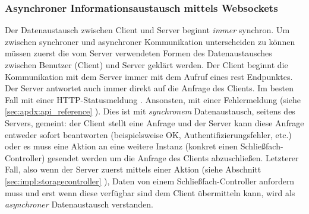 \subsubsection{Asynchroner Informationsaustausch mittels Websockets}\label{sec:impl:ws:datainterchange}
Der Datenaustausch zwischen Client und Server beginnt \textit{immer} synchron. Um zwischen synchroner und asynchroner Kommunikation unterscheiden zu können müssen zuerst die vom Server verwendeten Formen des Datenaustausches zwischen Benutzer (Client) und Server geklärt werden. Der Client beginnt die Kommunikation mit dem Server immer mit dem Aufruf eines \acrshort{rest} Endpunktes. Der Server antwortet auch immer direkt auf die Anfrage des Clients. Im besten Fall mit einer HTTP-Statusmeldung . Ansonsten, mit einer Fehlermeldung (siehe \ref{sec:apdx:api_reference} ). Dies ist mit \textit{synchronem} Datenaustausch, seitens des Servers, gemeint: der Client stellt eine Anfrage und der Server kann diese Anfrage entweder sofort beantworten (beispielsweise OK, Authentifizierungsfehler, etc.) oder es muss eine Aktion an eine weitere Instanz (konkret einen Schließfach-Controller) gesendet werden um die Anfrage des Clients abzuschließen. Letzterer Fall, also wenn der Server zuerst mittels einer Aktion (siehe Abschnitt \ref{sec:impl:storagecontroller} ), Daten von einem Schließfach-Controller anfordern muss und erst wenn diese verfügbar sind dem Client übermitteln kann, wird als \textit{asynchroner} Datenaustausch verstanden.\bigskip

